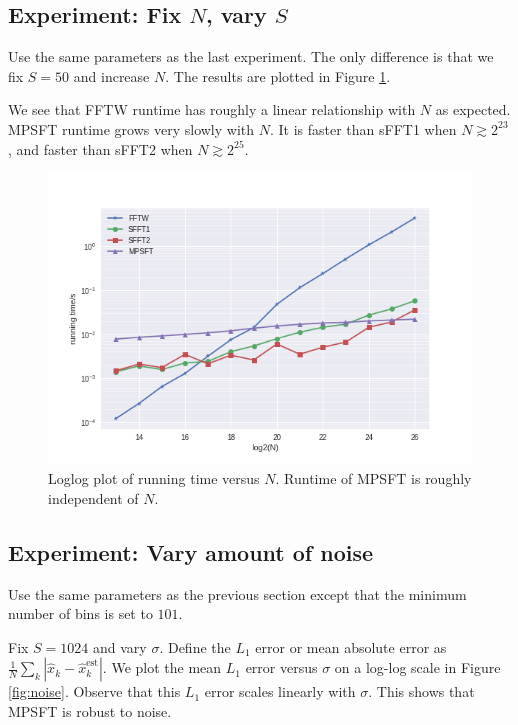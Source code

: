 \documentclass[10pt]{article}
\begin{document}
\subsection{Experiment: Fix $N$, vary $S$}
Use the same parameters as the last experiment. The only difference is that we fix $S=50$ and increase $N$. The results are plotted in Figure \ref{fig:runtime_vary_n}.

We see that FFTW runtime has roughly a linear relationship with $N$ as expected. MPSFT runtime grows very slowly with $N$. It is faster than sFFT1 when $N \gtrsim 2^{23}$, and faster than sFFT2 when $N \gtrsim 2^{25}$.

\begin{figure}
\centering
\includegraphics[scale=0.6]{./graph/runtime_vary_n}
\caption{Loglog plot of running time versus $N$. Runtime of MPSFT is roughly independent of $N$. \label{fig:runtime_vary_n}}
\end{figure}

\subsection{Experiment: Vary amount of noise}

Use the same parameters as the previous section except that the minimum number of bins is set to $101$.

Fix $S=1024$ and vary $\sigma$. Define the $L_1$ error or mean absolute error as $\frac{1}{N}\sum_k |\hat{x}_k - \hat{x}^{\text{est}}_k|$. We plot the mean $L_1$ error versus $\sigma$ on a log-log scale in Figure \ref{fig:noise}. Observe that this $L_1$ error scales linearly with $\sigma$. This shows that MPSFT is robust to noise.
\end{document}
